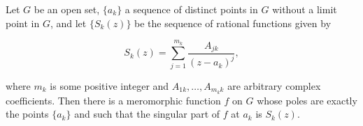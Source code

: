 Let \(G\) be an open set, \(\{a_k\}\) a sequence of distinct points in \(G\) without a limit point in \(G\), and let \(\{S_k(z)\}\) be the sequence of rational functions given by

\[
S_k(z) = \sum_{j=1}^{m_k} \frac{A_{jk}}{(z - a_k)^j},
\]

where \(m_k\) is some positive integer and \(A_{1k}, \ldots, A_{m_k k}\) are arbitrary complex coefficients. Then there is a meromorphic function \(f\) on \(G\) whose poles are exactly the points \(\{a_k\}\) and such that the singular part of \(f\) at \(a_k\) is \(S_k(z)\).
